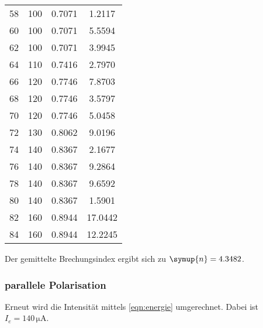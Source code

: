 \begin{table}
\begin{tabular}{c c c c}
      58&100&0.7071&1.2117 \\
      60&100&0.7071&5.5594 \\
      62&100&0.7071&3.9945 \\
      64&110&0.7416&2.7970 \\
      66&120&0.7746&7.8703 \\
      68&120&0.7746&3.5797 \\
      70&120&0.7746&5.0458 \\
      72&130&0.8062&9.0196 \\
      74&140&0.8367&2.1677 \\
      76&140&0.8367&9.2864 \\
      78&140&0.8367&9.6592 \\
      80&140&0.8367&1.5901 \\
     82&160&0.8944&17.0442 \\
     84&160&0.8944&12.2245 \\
        \bottomrule
    \end{tabular}
    \label{tab:MesswerteRef}
\end{table}

Der gemittelte Brechungsindex ergibt sich zu $\symup{n} = 4.3482$.

\subsubsection{parallele Polarisation}
Erneut wird die Intensität mittels \autoref{eqn:energie} umgerechnet. Dabei ist $I_e = 140 \, \unit{\micro\ampere}$. 